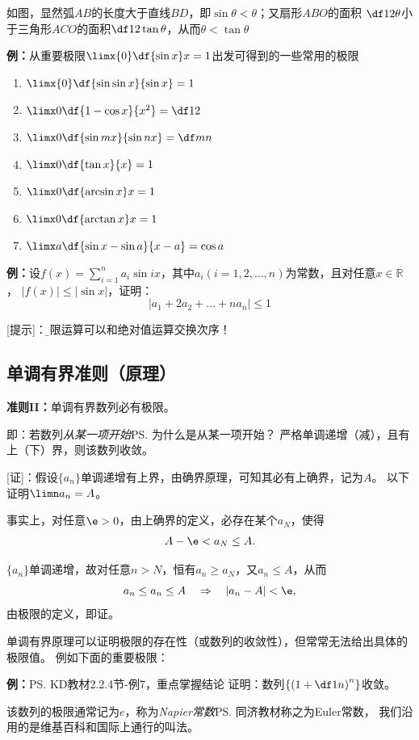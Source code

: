 如图，显然弧$AB$的长度大于直线$BD$，即$\sin\theta<\theta$；又扇形$ABO$的面积
$\df12\theta$小于三角形$ACO$的面积$\df12\tan\theta$，从而$\theta<\tan\theta$

{\b
{\bf 例：}从重要极限$\limx{0}\df{\sin x}x=1$出发可得到的一些常用的极限
\begin{enumerate}[(1)]
  \setlength{\itemindent}{1cm}
  \item $\limx{0}\df{\sin\sin x}{\sin x}=1$ 
  \item $\limx 0\df{1-\cos x}{x^2}=\df12$ 
  \item $\limx 0\df{\sin mx}{\sin nx}=\df mn$
  \item $\limx 0\df{\tan x}{x}=1$
  \item $\limx 0\df{\arcsin x}x=1$
  \item $\limx 0\df{\arctan x}x=1$
  \item $\limx a\df{\sin x-\sin a}{x-a}=\cos a$
\end{enumerate}
}

{\bf 例：}设$f(x)=\sum\limits_{i=1}^na_i\sin
ix$，其中$a_i(i=1,2,\ldots,n)$为常数，且对任意$x\in\mathbb{R}$， $|f(x)|\leq |\sin x|$，证明：
$$\left|a_1+2a_2+\ldots+na_n\right|\leq 1$$

[提示]：{\b 极限运算可以和绝对值运算交换次序！}

\subsection{单调有界准则（原理）}

{\bf 准则II：}单调有界数列必有极限。

即：若数列{\it 从某一项开始}\ps{为什么是从某一项开始？}
严格单调递增（减），且有上（下）界，则该数列收敛。

[证]：假设$\{a_n\}$单调递增有上界，由确界原理，可知其必有上确界，记为$A$。
以下证明$\limn a_n=A$。

事实上，对任意$\e>0$，由上确界的定义，必存在某个$a_N$，使得
$$A-\e<a_N\leq A.$$

$\{a_n\}$单调递增，故对任意$n>N$，恒有$a_n\geq a_N$，又$a_n\leq A$，从而
$$a_n\leq a_n\leq A\quad\Rightarrow\quad |a_n-A|<\e,$$
由极限的定义，即证。

单调有界原理可以证明极限的存在性（或数列的收敛性），但常常无法给出具体的极限值。
例如下面的重要极限：

{\bf 例：}\ps{KD教材2.2.4节-例7，重点掌握结论}
证明：数列$\left\{\left(1+\df1n\right)^n\right\}$收敛。

该数列的极限通常记为$e$，称为{\it Napier常数}\ps{同济教材称之为Euler常数，
我们沿用的是维基百科和国际上通行的叫法}。

